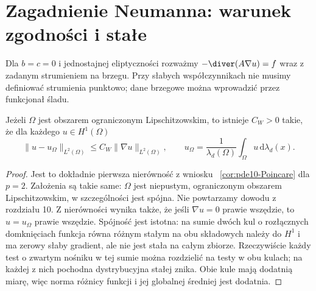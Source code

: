 \section{Zagadnienie Neumanna: warunek zgodności i stałe}
\label{sec:pde13-neumann}
Dla $b=c=0$ i jednostajnej eliptyczności rozważmy
$-\diver(A\nabla u)=f$ wraz z zadanym strumieniem na brzegu.
Przy słabych współczynnikach nie musimy definiować strumienia
punktowo; dane brzegowe można wprowadzić przez funkcjonał śladu.

\begin{lemat}
\label{lem:pde13-wirtinger}
Jeżeli $\Omega$ jest obszarem ograniczonym Lipschitzowskim,
to istnieje $C_W>0$ takie, że dla każdego $u\in H^1(\Omega)$
\[
\|u-u_\Omega\|_{L^2(\Omega)}\le C_W\|\nabla u\|_{L^2(\Omega)},
\qquad u_\Omega=\frac1{\lambda_d(\Omega)}
\int_\Omega u\,\mathrm d\lambda_d(x).
\]
\end{lemat}
\begin{proof}
Jest to dokładnie pierwsza nierówność z wniosku
~\ref{cor:pde10-Poincare} dla $p=2$. Założenia są takie same:
$\Omega$ jest niepustym, ograniczonym obszarem Lipschitzowskim,
w szczególności jest spójna. Nie powtarzamy dowodu z rozdziału 10.
Z nierówności wynika także, że jeśli $\nabla u=0$ prawie
wszędzie, to $u=u_\Omega$ prawie wszędzie.
Spójność jest istotna: na sumie dwóch kul o rozłącznych
domknięciach funkcja równa różnym stałym na obu składowych
należy do $H^1$ i ma zerowy słaby gradient, ale nie jest
stała na całym zbiorze. Rzeczywiście każdy test o zwartym
nośniku w tej sumie można rozdzielić na testy w obu kulach;
na każdej z nich pochodna dystrybucyjna stałej znika.
Obie kule mają dodatnią miarę, więc norma różnicy funkcji
i jej globalnej średniej jest dodatnia.
\end{proof}

